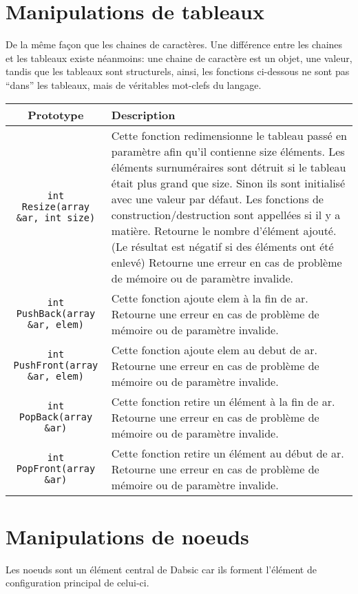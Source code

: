 \documentclass[a5paper, 12pt]{book}
\begin{document}
\chapter{Manipulations de tableaux}

De la même façon que les chaines de caractères. Une différence
entre les chaines et les tableaux existe néanmoins: une chaine
de caractère est un objet, une valeur, tandis que les tableaux
sont structurels, ainsi, les fonctions ci-dessous ne sont
pas ``dans'' les tableaux, mais de véritables mot-clefs du
langage.

\begin{tabular}{|c|l|}
  \hline
  Prototype & Description\\
  \hline
  \verb!int Resize(array &ar, int size)! &
  Cette fonction redimensionne le tableau passé en paramètre afin
  qu'il contienne size éléments. Les éléments surnuméraires sont
  détruit si le tableau était plus grand que size. Sinon ils
  sont initialisé avec une valeur par défaut.
  Les fonctions de construction/destruction sont appellées si
  il y a matière.
  Retourne le nombre d'élément ajouté. (Le résultat est négatif
  si des éléments ont été enlevé)
  Retourne une erreur en cas de problème de mémoire ou de paramètre
  invalide.
  \\
  \verb!int PushBack(array &ar, elem)! &
  Cette fonction ajoute elem à la fin de ar.
  Retourne une erreur en cas de problème de mémoire ou de paramètre
  invalide.
  \\
  \verb!int PushFront(array &ar, elem)! &
  Cette fonction ajoute elem au debut de ar.
  Retourne une erreur en cas de problème de mémoire ou de paramètre
  invalide.
  \\
  \verb!int PopBack(array &ar)! &
  Cette fonction retire un élément à la fin de ar.
  Retourne une erreur en cas de problème de mémoire ou de paramètre
  invalide.
  \\
  \verb!int PopFront(array &ar)! &
  Cette fonction retire un élément au début de ar.
  Retourne une erreur en cas de problème de mémoire ou de paramètre
  invalide. \\
  \hline
\end{tabular}

\chapter{Manipulations de noeuds}

Les noeuds sont un élément central de Dabsic car
ils forment l'élément de configuration principal de
celui-ci.
\end{document}

